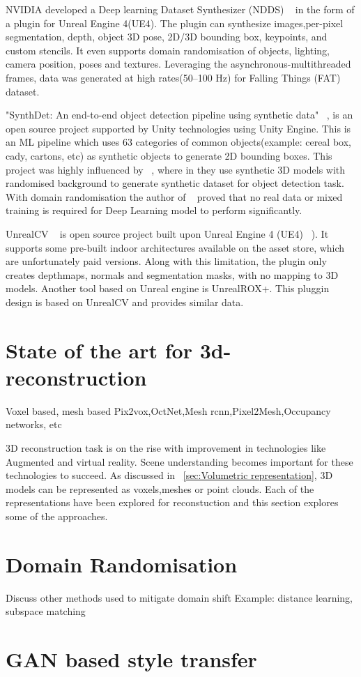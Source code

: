 NVIDIA developed a Deep learning Dataset Synthesizer (NDDS) ~\cite{to2018ndds} in the form of a plugin for Unreal Engine 4(UE4).
The plugin can synthesize images,per-pixel segmentation, depth, object 3D pose, 2D/3D bounding box, keypoints, and custom stencils.
It even supports domain randomisation of objects, lighting, camera position, poses and textures.
Leveraging the asynchronous-multithreaded frames, data was generated at high rates(50–100 Hz) for Falling Things (FAT) ~\cite{tremblay2018falling} dataset.

"SynthDet: An end-to-end object detection pipeline using synthetic data" ~\cite{synthdet2020}, is an open source project supported by Unity technologies using Unity Engine.
This is an ML pipeline which uses 63 categories of common objects(example: cereal box, cady, cartons, etc) as synthetic objects to generate 2D bounding boxes.
This project was highly influenced by ~\cite{hinterstoisser2019annotation}, where in they use synthetic 3D models with randomised background to generate synthetic dataset for object detection task.
With domain randomisation the author of ~\cite{hinterstoisser2019annotation} proved that no real data or mixed training is required for Deep Learning model to perform significantly.

UnrealCV ~\cite{qiu2017unrealcv} is open source project built upon Unreal Engine 4 (UE4) ~\cite{unrealengine}).
It supports some pre-built indoor architectures available on the asset store, which are unfortunately paid versions.
Along with this limitation, the plugin only creates depthmaps, normals and segmentation masks, with no mapping to 3D models.
Another tool based on Unreal engine is UnrealROX+\cite{martinezgonzalez2021unrealrox}.
This pluggin design is based on UnrealCV and provides similar data.

\section{State of the art for 3d-reconstruction}\label{sec:state_of_the_art}
Voxel based, mesh based
Pix2vox,OctNet,Mesh rcnn,Pixel2Mesh,Occupancy networks, etc

3D reconstruction task is on the rise with improvement in technologies like Augmented and virtual reality.
Scene understanding becomes important for these technologies to succeed.
As discussed in ~\ref{sec:Volumetric representation}, 3D models can be represented as voxels,meshes or point clouds.
Each of the representations have been explored for reconstuction and this section explores some of the approaches.



\section{Domain Randomisation}\label{sec:domain-randomisation}
Discuss other methods used to mitigate domain shift
Example: distance learning, subspace matching

\section{GAN based style transfer}\label{sec:gan_based_styletransfer}

